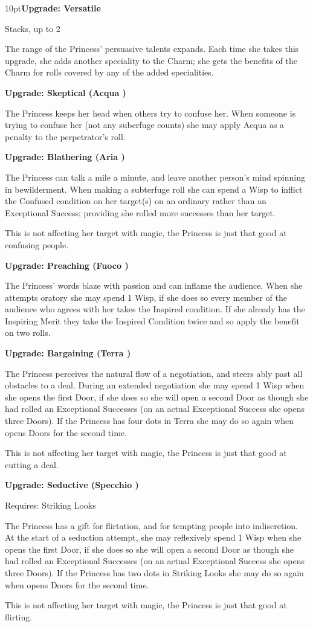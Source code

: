 \begin{myindentpar}{10pt}\textbf{Upgrade: Versatile}

Stacks, up to 2

The range of the Princess' persuasive talents expands. Each time she takes this upgrade, she adds another speciality to the Charm; she gets the benefits of the Charm for rolls covered by any of the added specialities.

\textbf{Upgrade: Skeptical (Acqua \textbullet\textbullet)}

The Princess keeps her head when others try to confuse her. When someone is trying to confuse her (not any suberfuge counts) she may apply Acqua as a penalty to the perpetrator's roll.

\textbf{Upgrade: Blathering (Aria \textbullet\textbullet)}

The Princess can talk a mile a minute, and leave another person's mind spinning in bewilderment. When making a subterfuge roll she can spend a Wisp to inflict the Confused condition on her target(s) on an ordinary rather than an Exceptional Success; providing she rolled more successes than her target.

This is not affecting her target with magic, the Princess is just that good at confusing people. 

\textbf{Upgrade: Preaching (Fuoco \textbullet\textbullet)}

The Princess' words blaze with passion and can inflame the audience. When she attempts oratory she may spend 1 Wisp, if she does so every member of the audience who agrees with her takes the Inspired condition. If she already has the Inspiring Merit they take the Inspired Condition twice and so apply the benefit on two rolls. 

\textbf{Upgrade: Bargaining (Terra \textbullet\textbullet)}

The Princess perceives the natural flow of a negotiation, and steers ably past all obstacles to a deal. During an extended negotiation she may spend 1 Wisp when she opens the first Door, if she does so she will open a second Door as though she had rolled an Exceptional Successes (on an actual Exceptional Success she opens three Doors). If the Princess has four dots in Terra she may do so again when opens Doors for the second time. 

This is not affecting her target with magic, the Princess is just that good at cutting a deal. 

\textbf{Upgrade: Seductive (Specchio \textbullet\textbullet)}

Requires: Striking Looks

The Princess has a gift for flirtation, and for tempting people into indiscretion. At the start of a seduction attempt, she may reflexively spend 1 Wisp when she opens the first Door, if she does so she will open a second Door as though she had rolled an Exceptional Successes (on an actual Exceptional Success she opens three Doors). If the Princess has two dots in Striking Looks she may do so again when opens Doors for the second time. 

This is not affecting her target with magic, the Princess is just that good at flirting. \end{myindentpar}

